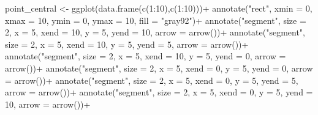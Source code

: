 \documentclass[
  letterpaper,
]{book}
\newenvironment{Shaded}{\begin{snugshade}}{\end{snugshade}}
\newcommand{\AttributeTok}[1]{\textcolor[rgb]{0.40,0.45,0.13}{#1}}
\newcommand{\DecValTok}[1]{\textcolor[rgb]{0.68,0.00,0.00}{#1}}
\newcommand{\FunctionTok}[1]{\textcolor[rgb]{0.28,0.35,0.67}{#1}}
\newcommand{\NormalTok}[1]{\textcolor[rgb]{0.00,0.23,0.31}{#1}}
\newcommand{\OtherTok}[1]{\textcolor[rgb]{0.00,0.23,0.31}{#1}}
\newcommand{\SpecialCharTok}[1]{\textcolor[rgb]{0.37,0.37,0.37}{#1}}
\newcommand{\StringTok}[1]{\textcolor[rgb]{0.13,0.47,0.30}{#1}}
\begin{document}
\begin{Shaded}
\begin{Highlighting}[]
\NormalTok{point\_central }\OtherTok{\textless{}{-}} \FunctionTok{ggplot}\NormalTok{(}\FunctionTok{data.frame}\NormalTok{(}\FunctionTok{c}\NormalTok{(}\DecValTok{1}\SpecialCharTok{:}\DecValTok{10}\NormalTok{),}\FunctionTok{c}\NormalTok{(}\DecValTok{1}\SpecialCharTok{:}\DecValTok{10}\NormalTok{)))}\SpecialCharTok{+}
  \FunctionTok{annotate}\NormalTok{(}\StringTok{"rect"}\NormalTok{, }\AttributeTok{xmin =} \DecValTok{0}\NormalTok{, }\AttributeTok{xmax =} \DecValTok{10}\NormalTok{, }\AttributeTok{ymin =} \DecValTok{0}\NormalTok{, }\AttributeTok{ymax =} \DecValTok{10}\NormalTok{, }\AttributeTok{fill =} \StringTok{"gray92"}\NormalTok{)}\SpecialCharTok{+}
  \FunctionTok{annotate}\NormalTok{(}\StringTok{"segment"}\NormalTok{, }\AttributeTok{size =} \DecValTok{2}\NormalTok{, }\AttributeTok{x =} \DecValTok{5}\NormalTok{, }\AttributeTok{xend =} \DecValTok{10}\NormalTok{, }\AttributeTok{y =} \DecValTok{5}\NormalTok{, }\AttributeTok{yend =} \DecValTok{10}\NormalTok{, }\AttributeTok{arrow =} \FunctionTok{arrow}\NormalTok{())}\SpecialCharTok{+}
  \FunctionTok{annotate}\NormalTok{(}\StringTok{"segment"}\NormalTok{, }\AttributeTok{size =} \DecValTok{2}\NormalTok{, }\AttributeTok{x =} \DecValTok{5}\NormalTok{, }\AttributeTok{xend =} \DecValTok{10}\NormalTok{, }\AttributeTok{y =} \DecValTok{5}\NormalTok{, }\AttributeTok{yend =} \DecValTok{5}\NormalTok{, }\AttributeTok{arrow =} \FunctionTok{arrow}\NormalTok{())}\SpecialCharTok{+}
  \FunctionTok{annotate}\NormalTok{(}\StringTok{"segment"}\NormalTok{, }\AttributeTok{size =} \DecValTok{2}\NormalTok{, }\AttributeTok{x =} \DecValTok{5}\NormalTok{, }\AttributeTok{xend =} \DecValTok{10}\NormalTok{, }\AttributeTok{y =} \DecValTok{5}\NormalTok{, }\AttributeTok{yend =} \DecValTok{0}\NormalTok{, }\AttributeTok{arrow =} \FunctionTok{arrow}\NormalTok{())}\SpecialCharTok{+}
  \FunctionTok{annotate}\NormalTok{(}\StringTok{"segment"}\NormalTok{, }\AttributeTok{size =} \DecValTok{2}\NormalTok{, }\AttributeTok{x =} \DecValTok{5}\NormalTok{, }\AttributeTok{xend =} \DecValTok{0}\NormalTok{, }\AttributeTok{y =} \DecValTok{5}\NormalTok{, }\AttributeTok{yend =} \DecValTok{0}\NormalTok{, }\AttributeTok{arrow =} \FunctionTok{arrow}\NormalTok{())}\SpecialCharTok{+}
  \FunctionTok{annotate}\NormalTok{(}\StringTok{"segment"}\NormalTok{, }\AttributeTok{size =} \DecValTok{2}\NormalTok{, }\AttributeTok{x =} \DecValTok{5}\NormalTok{, }\AttributeTok{xend =} \DecValTok{0}\NormalTok{, }\AttributeTok{y =} \DecValTok{5}\NormalTok{, }\AttributeTok{yend =} \DecValTok{5}\NormalTok{, }\AttributeTok{arrow =} \FunctionTok{arrow}\NormalTok{())}\SpecialCharTok{+}
  \FunctionTok{annotate}\NormalTok{(}\StringTok{"segment"}\NormalTok{, }\AttributeTok{size =} \DecValTok{2}\NormalTok{, }\AttributeTok{x =} \DecValTok{5}\NormalTok{, }\AttributeTok{xend =} \DecValTok{0}\NormalTok{, }\AttributeTok{y =} \DecValTok{5}\NormalTok{, }\AttributeTok{yend =} \DecValTok{10}\NormalTok{, }\AttributeTok{arrow =} \FunctionTok{arrow}\NormalTok{())}\SpecialCharTok{+}

\end{Highlighting}
\end{Shaded}
\end{document}
